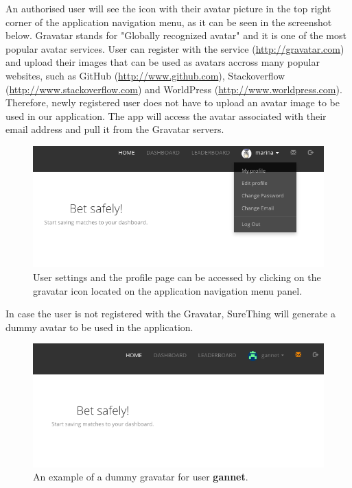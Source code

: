 An authorised user will see the icon with their avatar picture in the top right corner of the application navigation menu, as it can be seen in the screenshot below. Gravatar stands for "Globally recognized avatar" and it is one of the most popular avatar services. User can register with the service (\url{http://gravatar.com}) and upload their images that can be used as avatars accross many popular websites, such as GitHub (\url{http://www.github.com}), Stackoverflow (\url{http://www.stackoverflow.com}) and WorldPress (\url{http://www.worldpress.com}). Therefore, newly registered user does not have to upload an avatar image to be used in our application. The app will access the avatar associated with their email address and pull it from the Gravatar servers. 

\begin{figure}[H]
	\begin{center}
		\includegraphics[width=.90\textwidth]{impl/images/gravatar}
		\caption{User settings and the profile page can be accessed by clicking on the gravatar icon located on the application navigation menu panel.} \label{fig:gravatar}
	\end{center}
\end{figure}

In case the user is not registered with the Gravatar, SureThing will generate a dummy avatar to be used in the application.

\begin{figure}[H]
	\begin{center}
		\includegraphics[width=.90\textwidth]{impl/images/dummyGravatar}
		\caption{An example of a dummy gravatar for user \textbf{gannet}.} \label{fig:dummygravatar}
	\end{center}
\end{figure}

